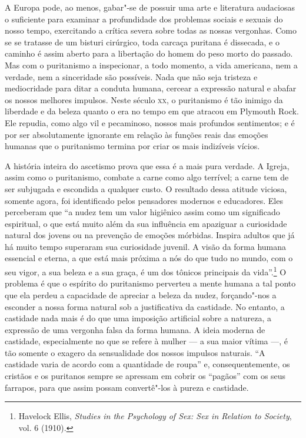 A Europa pode, ao menos, gabar"-se de possuir uma arte e literatura audaciosas
o suficiente para examinar a profundidade dos problemas sociais e sexuais do
nosso tempo, exercitando a crítica severa sobre todas as nossas
vergonhas. Como se se tratasse de um bisturi cirúrgico, toda carcaça
puritana é dissecada, e o caminho é assim aberto para a libertação do
homem do peso morto do passado. Mas com o puritanismo a inspecionar, a
todo momento, a vida americana, nem a verdade, nem a sinceridade são
possíveis. Nada que não seja tristeza e mediocridade para ditar a
conduta humana, cercear a expressão natural e abafar os nossos melhores
impulsos. Neste século \textsc{xx}, o puritanismo é tão inimigo da liberdade e da
beleza quanto o era no tempo em que atracou em Plymouth Rock. Ele
repudia, como algo vil e pecaminoso, nossos mais profundos sentimentos;
e é por ser absolutamente ignorante em relação às funções reais das
emoções humanas que o puritanismo termina por criar os mais indizíveis
vícios.

A história inteira do ascetismo prova que essa é a mais pura verdade. A
Igreja, assim como o puritanismo, combate a carne como algo terrível;
a carne tem de ser subjugada e escondida a qualquer custo. O resultado
dessa atitude viciosa, somente agora, foi identificado pelos pensadores
modernos e educadores. Eles perceberam que ``a nudez tem um valor
higiênico assim como um significado espiritual, o que está muito além da sua influência em apaziguar a curiosidade natural dos jovens ou na prevenção de %
emoções mórbidas. Inspira adultos que já há muito tempo superaram sua
curiosidade juvenil. A visão da forma humana essencial e eterna, a que
está mais próxima a nós do que tudo no mundo, com o seu vigor, a sua
beleza e a sua graça, é um dos tônicos principais da vida''.\footnote{Havelock
  Ellis, \emph{Studies in the Psychology of Sex: Sex in Relation to
  Society}, vol. 6 (1910).} O problema é que o espírito do puritanismo
perverteu a mente humana a tal ponto que ela perdeu a capacidade de
apreciar a beleza da nudez, forçando"-nos a esconder a nossa forma
natural sob a justificativa da castidade. No entanto, a castidade
nada mais é do que uma imposição artificial sobre a natureza, a
expressão de uma vergonha falsa da forma humana. A ideia moderna de
castidade, especialmente no que se refere à mulher --- a sua maior vítima
---, é tão somente o exagero da sensualidade dos nossos impulsos
naturais. ``A castidade varia de acordo com a quantidade de roupa'' e,
consequentemente, os cristãos e os puritanos sempre se apressam em
cobrir os ``pagãos'' com os seus farrapos, para que assim possam convertê"-los à pureza e castidade.

